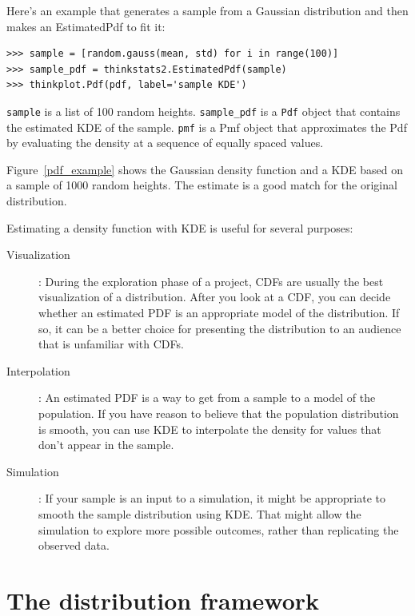 \documentclass[12pt]{book}
\begin{document}
Here's an example that generates a sample from a Gaussian
distribution and then makes an EstimatedPdf to fit it:

\begin{verbatim}
>>> sample = [random.gauss(mean, std) for i in range(100)]
>>> sample_pdf = thinkstats2.EstimatedPdf(sample)
>>> thinkplot.Pdf(pdf, label='sample KDE')
\end{verbatim}

\verb"sample" is a list of 100 random heights.
\verb"sample_pdf" is a {\tt Pdf} object that contains the estimated
KDE of the sample.  {\tt pmf} is a Pmf object that approximates the Pdf by
evaluating the density at a sequence of equally spaced values.

Figure~\ref{pdf_example} shows the Gaussian density function and a KDE
based on a sample of 1000 random heights.  The estimate is a good
match for the original distribution.

Estimating a density function with KDE is useful for several purposes:

\begin{description}

\item[Visualization]: During the exploration phase of a project, CDFs
  are usually the best visualization of a distribution.  After you
  look at a CDF, you can decide whether an estimated PDF is an
  appropriate model of the distribution.  If so, it can be a better
  choice for presenting the distribution to an audience that is
  unfamiliar with CDFs.

\item[Interpolation]: An estimated PDF is a way to get from a sample
  to a model of the population.  If you have reason to believe that
  the population distribution is smooth, you can use KDE to interpolate
  the density for values that don't appear in the sample.

\item[Simulation]: If your sample is an input to a simulation, it
  might be appropriate to smooth the sample distribution using KDE.
  That might allow the simulation to explore more possible outcomes,
  rather than replicating the observed data.

\end{description}


\section{The distribution framework}
\end{document}
